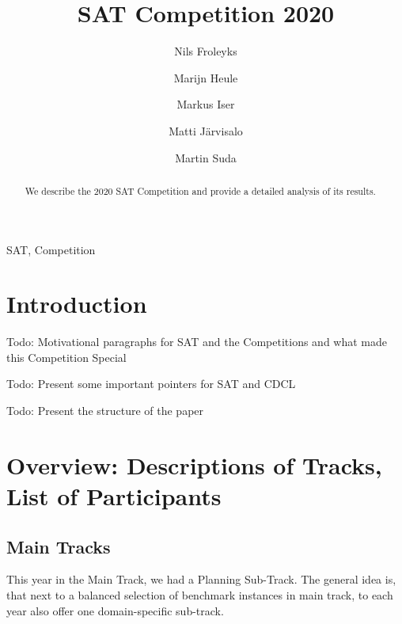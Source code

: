 \documentclass{elsarticle}
\title{SAT Competition 2020\tnoteref{title}}
\author[jku]{Nils Froleyks}
\author[cmu]{Marijn Heule}
\author[kit]{Markus Iser}
\author[hiit]{Matti Järvisalo}
\author[ctu]{Martin Suda}
\newcommand{\todo}[1]{{\color{purple}Todo: #1}}
\begin{document}
\begin{abstract}
We describe the 2020 SAT Competition and provide a detailed analysis of its results.
\end{abstract}

\begin{keyword}
SAT, Competition
\end{keyword}

\maketitle

\section{Introduction}

\todo{Motivational paragraphs for SAT and the Competitions and what made this Competition Special}

\todo{Present some important pointers for SAT and CDCL}

\todo{Present the structure of the paper}


\section{Overview: Descriptions of Tracks, List of Participants}

\subsection{Main Tracks}

This year in the Main Track, we had a Planning Sub-Track. 
The general idea is, that next to a balanced selection of benchmark instances in main track, to each year also offer one domain-specific sub-track. 



\makeatletter
\newcommand{\stack}[1]{%
\begin{tabular}{@{}l@{}}#1\checknextarg}
\newcommand{\checknextarg}{\@ifnextchar\bgroup{\gobblenextarg}{\end{tabular}}}
\newcommand{\gobblenextarg}[1]{\\#1\@ifnextchar\bgroup{\gobblenextarg}{\end{tabular}}}
\makeatother
\end{document}
